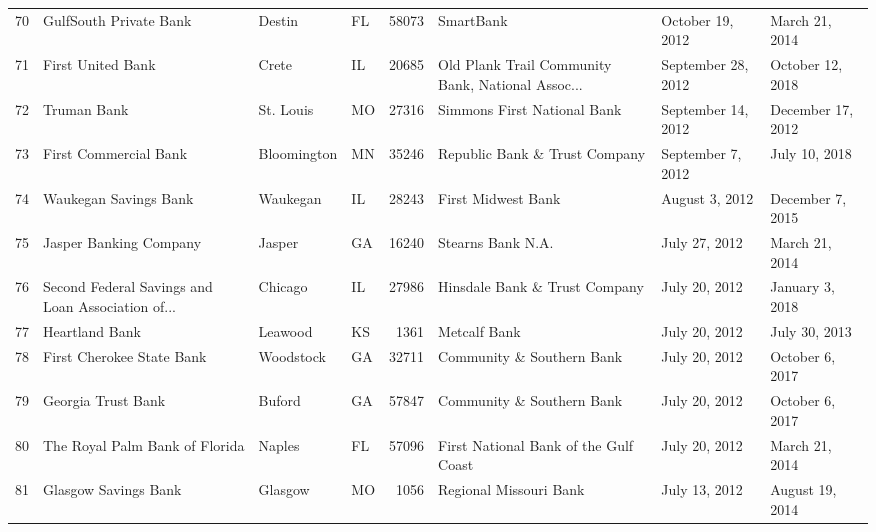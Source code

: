 \begin{tabular}{llllrlll}
70  &                             GulfSouth Private Bank &              Destin &  FL &  58073 &                                          SmartBank &    October 19, 2012 &      March 21, 2014 \\
71  &                                  First United Bank &               Crete &  IL &  20685 &  Old Plank Trail Community Bank, National Assoc... &  September 28, 2012 &    October 12, 2018 \\
72  &                                        Truman Bank &           St. Louis &  MO &  27316 &                        Simmons First National Bank &  September 14, 2012 &   December 17, 2012 \\
73  &                              First Commercial Bank &         Bloomington &  MN &  35246 &                      Republic Bank \& Trust Company &   September 7, 2012 &       July 10, 2018 \\
74  &                              Waukegan Savings Bank &            Waukegan &  IL &  28243 &                                 First Midwest Bank &      August 3, 2012 &    December 7, 2015 \\
75  &                             Jasper Banking Company &              Jasper &  GA &  16240 &                                  Stearns Bank N.A. &       July 27, 2012 &      March 21, 2014 \\
76  &  Second Federal Savings and Loan Association of... &             Chicago &  IL &  27986 &                      Hinsdale Bank \& Trust Company &       July 20, 2012 &     January 3, 2018 \\
77  &                                     Heartland Bank &             Leawood &  KS &   1361 &                                       Metcalf Bank &       July 20, 2012 &       July 30, 2013 \\
78  &                          First Cherokee State Bank &           Woodstock &  GA &  32711 &                          Community \& Southern Bank &       July 20, 2012 &     October 6, 2017 \\
79  &                                 Georgia Trust Bank &              Buford &  GA &  57847 &                          Community \& Southern Bank &       July 20, 2012 &     October 6, 2017 \\
80  &                     The Royal Palm Bank of Florida &              Naples &  FL &  57096 &              First National Bank of the Gulf Coast &       July 20, 2012 &      March 21, 2014 \\
81  &                               Glasgow Savings Bank &             Glasgow &  MO &   1056 &                             Regional Missouri Bank &       July 13, 2012 &     August 19, 2014 \\

\end{tabular}
